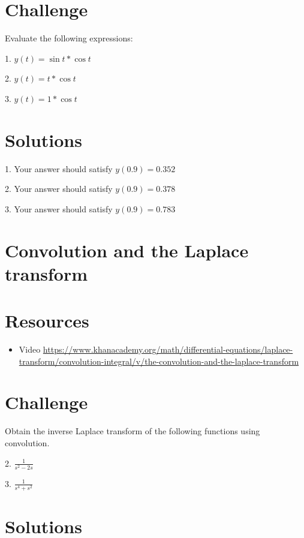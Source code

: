 \section*{Challenge}
Evaluate the following expressions:

1. $y(t) = \sin t * \cos t$

2. $y(t) = t * \cos t$

3. $y(t) = 1 * \cos t$

\section*{Solutions}
1. Your answer should satisfy $y(0.9) = 0.352$

2. Your answer should satisfy $y(0.9) = 0.378$

3. Your answer should satisfy $y(0.9) = 0.783$




\newpage
\section{Convolution and the Laplace transform}

\section*{Resources}
\begin{itemize}
    \item Video \url{https://www.khanacademy.org/math/differential-equations/laplace-transform/convolution-integral/v/the-convolution-and-the-laplace-transform}
\end{itemize}

\section*{Challenge}
Obtain the inverse Laplace transform of the following functions using convolution.


2. $\displaystyle \frac{1}{s^2 - 2s}$

3. $\displaystyle \frac{1}{s^4 + s^2}$

\section*{Solutions}


